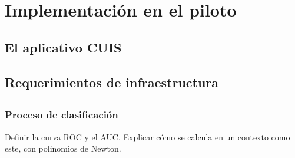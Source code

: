 \chapter{Implementación en el piloto}
\label{chap:implementacion}
\section*{El aplicativo CUIS}
\section*{Requerimientos de infraestructura}
\section*{}
\subsection*{Proceso de clasificación}
Definir la curva ROC y el AUC. Explicar cómo se calcula en un contexto como este, con polinomios de Newton.
